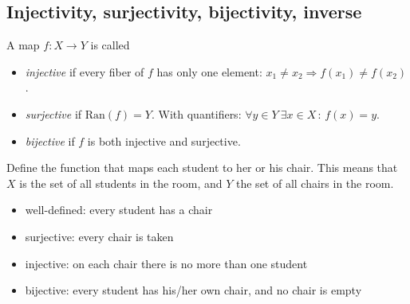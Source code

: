 

\subsection*{Injectivity, surjectivity, bijectivity, inverse}

\begin{Definition}
A map $f: X \to Y$ is called
\begin{itemize}
 \item \emph{injective} if every fiber of $f$ has only one element: $x_1 \neq x_2 \Rightarrow f(x_1) \neq f(x_2)$.
 \item \emph{surjective} if $\mathrm{Ran}(f)=Y$. With quantifiers: $\forall y\in Y~ \exists x\in X \,:\, f(x)=y$.
 \item \emph{bijective} if $f$ is both injective and surjective.
\end{itemize}
\end{Definition}


\begin{example}
Define the function that maps each student to
her or his chair. This means that $X$ is the set of all students in the room,
and $Y$ the set of all chairs in the room.
\begin{itemize}
 \item well-defined: every student has a chair
 \item surjective: every chair is taken
 \item injective: on each chair there is no more than one student
 \item bijective: every student has his/her own chair, and no chair is empty
\end{itemize}
\end{example}


